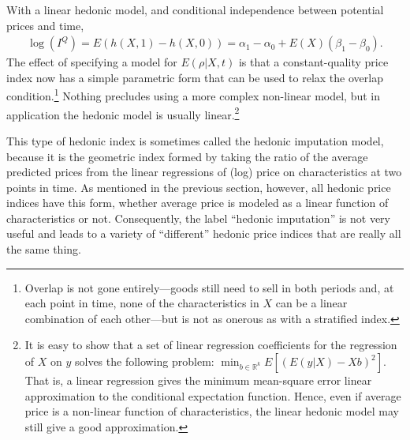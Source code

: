 \documentclass[]{article}
\begin{document}
With a linear hedonic model, and conditional independence between potential prices and time,
\begin{align*}
\log(I^{Q}) = E(h(X, 1) - h(X, 0)) = \alpha_{1} - \alpha_{0} + E(X)(\beta_{1} - \beta_{0}). 
\end{align*}
The effect of specifying a model for \(E(\rho | X, t)\) is that a constant-quality price index now has a simple parametric form that can be used to relax the overlap condition.\footnote{Overlap is not gone entirely---goods still need to sell in both periods and, at each point in time, none of the characteristics in \(X\) can be a linear combination of each other---but is not as onerous as with a stratified index.} Nothing precludes using a more complex non-linear model, but in application the hedonic model is usually linear.\footnote{It is easy to show that a set of linear regression coefficients for the regression of \(X\) on \(y\) solves the following problem: \(\min_{b \in \mathbb{R}^{k}} E[(E(y | X) - Xb)^{2}]\). That is, a linear regression gives the minimum mean-square error linear approximation to the conditional expectation function. Hence, even if average price is a non-linear function of characteristics, the linear hedonic model may still give a good approximation.}

This type of hedonic index is sometimes called the hedonic imputation model, because it is the geometric index formed by taking the ratio of the average predicted prices from the linear regressions of (log) price on characteristics at two points in time. As mentioned in the previous section, however, all hedonic price indices have this form, whether average price is modeled as a linear function of characteristics or not. Consequently, the label ``hedonic imputation'' is not very useful and leads to a variety of ``different'' hedonic price indices that are really all the same thing.
\end{document}
